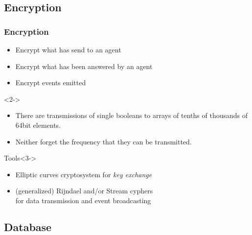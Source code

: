 \documentclass{beamer}
\begin{document}
\subsection{Encryption}

\begin{frame}
\frametitle{Encryption}
    \begin{itemize}
        \item Encrypt what has send to an agent
        \item Encrypt what has been answered by an agent
        \item Encrypt events emitted
    \end{itemize}
    \begin{exampleblock}{}<2->
        \begin{itemize}
            \item There are transmissions of single booleans to arrays of tenths of thousands of 64bit elements.
            \item Neither forget the frequency that they can be transmitted.
        \end{itemize}
    \end{exampleblock}
    \begin{alertblock}{Tools}<3->
        \begin{itemize}
            \item Elliptic curves cryptosystem for \emph{key exchange}
            \item (generalized) Rijndael and/or Stream cyphers\\for data transmission and event broadcasting
        \end{itemize}
    \end{alertblock}
\end{frame}

\subsection{Database}
\end{document}
